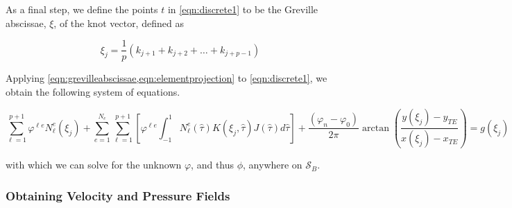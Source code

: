 As a final step, we define the points $t$ in \cref{eqn:discrete1} to be the Greville abscissae, \(\xi\), of the knot vector, defined as

\begin{equation}
\label{eqn:grevilleabscissae}
\xi_j = \frac{1}{p}\left(k_{j+1} + k_{j+2} + \dots + k_{j+p-1} \right)
\end{equation}

\noindent Applying \cref{eqn:grevilleabscissae,eqn:elementprojection} to \cref{eqn:discrete1}, we obtain the following system of equations.

\begin{equation}
\sum_{\ell=1}^{p+1}\varphi^{\ell e} N_{\ell}^{e}(\xi_j) +  \sum_{e=1}^{N_e} \sum_{\ell=1}^{p+1} \left[ \varphi^{\ell e} \int_{-1}^{1} N_{\ell}^{e}(\hat{\tau}) K(\xi_j,\hat{\tau}) J(\hat{\tau}) d\hat{\tau} \right] + \frac{\left(\varphi_n - \varphi_0 \right)}{2\pi} \arctan\left( \frac{y(\xi_j) - y_{TE}}{x(\xi_j)-x_{TE}} \right) = g(\xi_j)
\end{equation}

\noindent with which we can solve for the unknown $\varphi$, and thus $\phi$, anywhere on $\mathcal{S}_B$.


\subsubsection{Obtaining Velocity and Pressure Fields}

